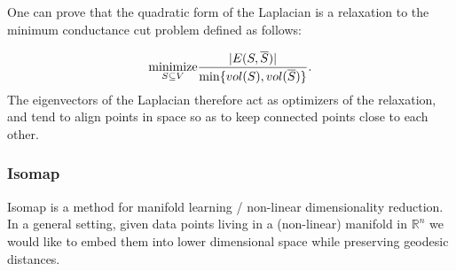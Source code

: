 One can prove that the quadratic form of the Laplacian is a relaxation to the minimum conductance cut problem defined as follows:

\[
    \underset{S  \subseteq V }{\text{minimize}} {|E(S,\overline{S})|\over \min\{vol(S), vol(\overline{S})\}}.
\]
The eigenvectors of the Laplacian therefore act as optimizers of the relaxation, and tend to align points in space so as to keep connected points close to each other.

\subsubsection*{Isomap}
Isomap is a method for manifold learning / non-linear dimensionality reduction. In a general setting, given data points living in a (non-linear) manifold in $\mathbb{R}^n$ we would like to embed them into lower dimensional space while preserving geodesic distances.

